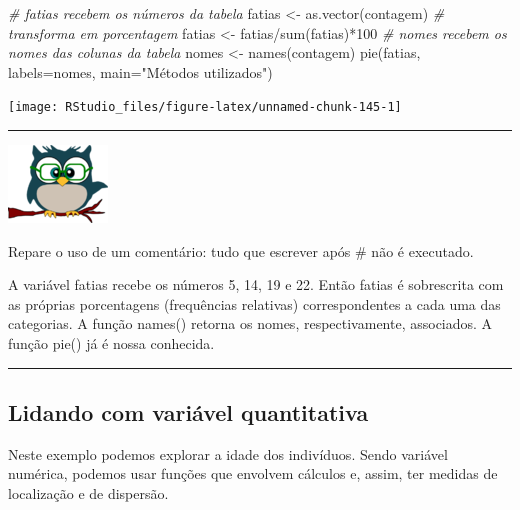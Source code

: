 \documentclass[
]{article}
\newenvironment{Shaded}{\begin{snugshade}}{\end{snugshade}}
\newcommand{\AttributeTok}[1]{\textcolor[rgb]{0.77,0.63,0.00}{#1}}
\newcommand{\CommentTok}[1]{\textcolor[rgb]{0.56,0.35,0.01}{\textit{#1}}}
\newcommand{\DecValTok}[1]{\textcolor[rgb]{0.00,0.00,0.81}{#1}}
\newcommand{\FunctionTok}[1]{\textcolor[rgb]{0.00,0.00,0.00}{#1}}
\newcommand{\NormalTok}[1]{#1}
\newcommand{\OtherTok}[1]{\textcolor[rgb]{0.56,0.35,0.01}{#1}}
\newcommand{\SpecialCharTok}[1]{\textcolor[rgb]{0.00,0.00,0.00}{#1}}
\newcommand{\StringTok}[1]{\textcolor[rgb]{0.31,0.60,0.02}{#1}}
\begin{document}
\begin{Shaded}
\begin{Highlighting}[]
\CommentTok{\# fatias recebem os números da tabela}
\NormalTok{fatias }\OtherTok{\textless{}{-}} \FunctionTok{as.vector}\NormalTok{(contagem)}
\CommentTok{\# transforma em porcentagem}
\NormalTok{fatias }\OtherTok{\textless{}{-}}\NormalTok{ fatias}\SpecialCharTok{/}\FunctionTok{sum}\NormalTok{(fatias)}\SpecialCharTok{*}\DecValTok{100}
\CommentTok{\# nomes recebem os nomes das colunas da tabela}
\NormalTok{nomes }\OtherTok{\textless{}{-}} \FunctionTok{names}\NormalTok{(contagem)}
\FunctionTok{pie}\NormalTok{(fatias, }\AttributeTok{labels=}\NormalTok{nomes, }\AttributeTok{main=}\StringTok{"Métodos utilizados"}\NormalTok{)}
\end{Highlighting}
\end{Shaded}

\begin{center}\texttt{[image: RStudio\_files/figure-latex/unnamed-chunk-145-1]} \end{center}

\begin{center}\rule{0.5\linewidth}{0.5pt}\end{center}

\begin{flushleft}\includegraphics[width=0.08\linewidth]{coruja} \end{flushleft}

Repare o uso de um comentário: tudo que escrever após \# não é
executado.

A variável fatias recebe os números 5, 14, 19 e 22. Então fatias é
sobrescrita com as próprias porcentagens (frequências relativas)
correspondentes a cada uma das categorias. A função names() retorna os
nomes, respectivamente, associados. A função pie() já é nossa conhecida.

\begin{center}\rule{0.5\linewidth}{0.5pt}\end{center}

\hypertarget{lidando-com-variuxe1vel-quantitativa}{%
\subsection{Lidando com variável
quantitativa}\label{lidando-com-variuxe1vel-quantitativa}}

Neste exemplo podemos explorar a idade dos indivíduos. Sendo variável
numérica, podemos usar funções que envolvem cálculos e, assim, ter
medidas de localização e de dispersão.
\end{document}
